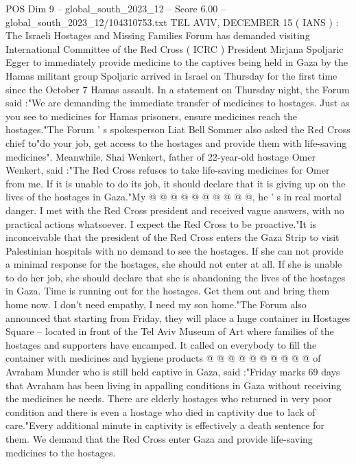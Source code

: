 \begin{textsample}{POS Dim 9 – global\_south\_2023\_12 – Score 6.00 – global\_south\_2023\_12/104310753.txt}  \label{ex:f9_pos_006}
TEL AVIV, DECEMBER 15 ( IANS ) : The Israeli Hostages and Missing Families Forum has demanded visiting International Committee of the Red Cross ( ICRC ) President Mirjana Spoljaric Egger to immediately provide medicine to the captives being held in Gaza by the Hamas militant group Spoljaric arrived in Israel on Thursday for the first time since the October 7 Hamas assault.
In a statement on Thursday night, the Forum said :"We are demanding the immediate transfer of medicines to hostages.
Just as you see to medicines for Hamas prisoners, ensure medicines reach the hostages."The Forum ' s spokesperson Liat Bell Sommer also asked the Red Cross chief to"do your job, get access to the hostages and provide them with life-saving medicines".
Meanwhile, Shai Wenkert, father of 22-year-old hostage Omer Wenkert, said :"The Red Cross refuses to take life-saving medicines for Omer from me.
If it is unable to do its job, it should declare that it is giving up on the lives of the hostages in Gaza."My @ @ @ @ @ @ @ @ @ @, he ' s in real mortal danger.
I met with the Red Cross president and received vague answers, with no practical actions whatsoever.
I expect the Red Cross to be proactive."It is inconceivable that the president of the Red Cross enters the Gaza Strip to visit Palestinian hospitals with no demand to see the hostages.
If she can not provide a minimal response for the hostages, she should not enter at all.
If she is unable to do her job, she should declare that she is abandoning the lives of the hostages in Gaza.
Time is running out for the hostages.
Get them out and bring them home now.
I don't need empathy, I need my son home."The Forum also announced that starting from Friday, they will place a huge container in Hostages Square -- located in front of the Tel Aviv Museum of Art where families of the hostages and supporters have encamped.
It called on everybody to fill the container with medicines and hygiene products @ @ @ @ @ @ @ @ @ @ of Avraham Munder who is still held captive in Gaza, said :"Friday marks 69 days that Avraham has been living in appalling conditions in Gaza without receiving the medicines he needs.
There are elderly hostages who returned in very poor condition and there is even a hostage who died in captivity due to lack of care."Every additional minute in captivity is effectively a death sentence for them.
We demand that the Red Cross enter Gaza and provide life-saving medicines to the hostages.

\end{textsample}
